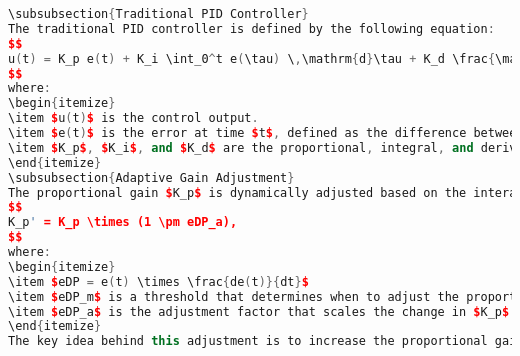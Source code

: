 \documentclass[a4paper,12pt]{report}
\begin{document}
\begin{lstlising}[language=C++]
\begin{lstlisting}[language=C++]
\subsubsection{Traditional PID Controller}
The traditional PID controller is defined by the following equation:
$$
u(t) = K_p e(t) + K_i \int_0^t e(\tau) \,\mathrm{d}\tau + K_d \frac{\mathrm{d}e(t)}{\mathrm{d}t},
$$
where:
\begin{itemize}
\item $u(t)$ is the control output.
\item $e(t)$ is the error at time $t$, defined as the difference between the desired value and the measured value.
\item $K_p$, $K_i$, and $K_d$ are the proportional, integral, and derivative gains, respectively.
\end{itemize}
\subsubsection{Adaptive Gain Adjustment}
The proportional gain $K_p$ is dynamically adjusted based on the interaction between the current error $e(t)$ and its rate of change (derivative). This adjustment is designed to improve the responsiveness of the controller to changing conditions. The adaptation can be mathematically expressed as follows:
$$
K_p' = K_p \times (1 \pm eDP_a),
$$
where:
\begin{itemize}
\item $eDP = e(t) \times \frac{de(t)}{dt}$
\item $eDP_m$ is a threshold that determines when to adjust the proportional gain.
\item $eDP_a$ is the adjustment factor that scales the change in $K_p$ based on the error’s derivative. 
\end{itemize}
The key idea behind this adjustment is to increase the proportional gain when the system is experiencing a large error combined with a significant rate of change, which could indicate an approaching overshoot or oscillation. Conversely, if the error is decreasing but remains large, it may reduce the proportional gain to prevent excessive correction, allowing the system to stabilize more smoothly.

\end{lstlisting}
\end{lstlising}
\end{document}
